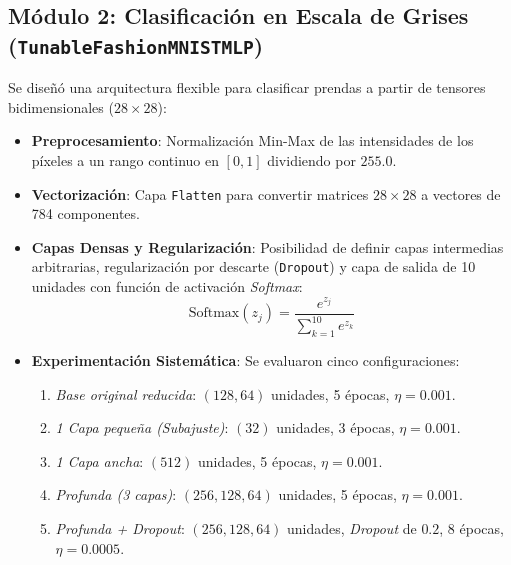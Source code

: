 \documentclass[12pt]{article}
\begin{document}
	\subsection{Módulo 2: Clasificación en Escala de Grises (\texttt{TunableFashionMNISTMLP})}
	Se diseñó una arquitectura flexible para clasificar prendas a partir de tensores bidimensionales ($28 \times 28$):
	\begin{itemize}
		\item \textbf{Preprocesamiento}: Normalización Min-Max de las intensidades de los píxeles a un rango continuo en $[0, 1]$ dividiendo por $255.0$.
		\item \textbf{Vectorización}: Capa \texttt{Flatten} para convertir matrices $28 \times 28$ a vectores de 784 componentes.
		\item \textbf{Capas Densas y Regularización}: Posibilidad de definir capas intermedias arbitrarias, regularización por descarte (\texttt{Dropout}) y capa de salida de 10 unidades con función de activación \textit{Softmax}:
		\begin{equation}
			\text{Softmax}(z_j) = \frac{e^{z_j}}{\sum_{k=1}^{10} e^{z_k}}
		\end{equation}
		\item \textbf{Experimentación Sistemática}: Se evaluaron cinco configuraciones:
		\begin{enumerate}
			\item \textit{Base original reducida}: $(128, 64)$ unidades, 5 épocas, $\eta = 0.001$.
			\item \textit{1 Capa pequeña (Subajuste)}: $(32)$ unidades, 3 épocas, $\eta = 0.001$.
			\item \textit{1 Capa ancha}: $(512)$ unidades, 5 épocas, $\eta = 0.001$.
			\item \textit{Profunda (3 capas)}: $(256, 128, 64)$ unidades, 5 épocas, $\eta = 0.001$.
			\item \textit{Profunda + Dropout}: $(256, 128, 64)$ unidades, \textit{Dropout} de $0.2$, 8 épocas, $\eta = 0.0005$.
		\end{enumerate}
	\end{itemize}
	
\end{document}
